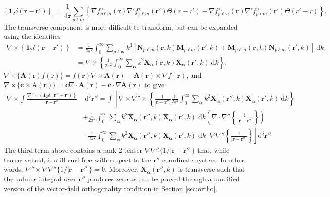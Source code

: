 \documentclass{article}
\numberwithin{equation}{section}
\begin{document}
\begin{equation}
\left[\bm{1}_2\delta(\mathbf{r} - \mathbf{r}')\right]_\parallel = \frac{1}{4\pi}\sum_{p\ell m}\left\{\nabla f_{p\ell m}^>(\mathbf{r}) \nabla'f_{p\ell m}^<(\mathbf{r}')\Theta(r - r') + \nabla f_{p\ell m}^<(\mathbf{r})\nabla'f_{p\ell m}^>(\mathbf{r}')\Theta(r' - r)\right\}.
\end{equation}
The transverse component is more difficult to transform, but can be expanded using the identities
\begin{equation}
\begin{split}
\nabla\times\left\{\bm{1}_2\delta(\mathbf{r} - \mathbf{r}')\right\} &= \frac{1}{2\pi^2}\int_0^\infty\sum_{p\ell m}k^3\left[\mathbf{N}_{p\ell m}(\mathbf{r},k)\mathbf{M}_{p\ell m}(\mathbf{r}',k) + \mathbf{M}_{p\ell m}(\mathbf{r},k)\mathbf{N}_{p\ell m}(\mathbf{r}',k)\right]\;\mathrm{d}k\\
&= \nabla\times\left\{\frac{1}{2\pi^2}\int_0^\infty\sum_{\bm{\alpha}}k^2\mathbf{X}_{\bm{\alpha}}(\mathbf{r},k)\mathbf{X}_{\bm{\alpha}}(\mathbf{r}',k)\;\mathrm{d}k\right\},
\end{split}
\end{equation}
$\nabla\times\{\mathbf{A}(\mathbf{r})f(\mathbf{r})\} = f(\mathbf{r})\nabla\times\mathbf{A}(\mathbf{r}) - \mathbf{A}(\mathbf{r})\times\nabla f(\mathbf{r})$, and $\nabla\times\{\mathbf{c}\times \mathbf{A}(\mathbf{r})\} = \mathbf{c}\nabla\cdot \mathbf{A}(\mathbf{r}) - \mathbf{c}\cdot\nabla \mathbf{A}(\mathbf{r})$ to give
\begin{equation}
\begin{split}
\nabla\times\int\frac{\nabla''\times\left\{\bm{1}_2\delta(\mathbf{r}'' - \mathbf{r}')\right\}}{|\mathbf{r} - \mathbf{r}''|}&\;\mathrm{d}^3\mathbf{r}'' = \int\left[\nabla\times\nabla''\times\left\{\frac{1}{|\mathbf{r} - \mathbf{r}''|}\frac{1}{2\pi^2}\int_0^\infty\sum_{\bm{\alpha}}k^2\mathbf{X}_{\bm{\alpha}}(\mathbf{r}'',k)\mathbf{X}_{\bm{\alpha}}(\mathbf{r}',k)\;\mathrm{d}k\right\}\right.\\
&+\frac{1}{2\pi^2}\int_0^\infty\sum_{\bm{\alpha}}k^2\mathbf{X}_{\bm{\alpha}}(\mathbf{r}'',k)\mathbf{X}_{\bm{\alpha}}(\mathbf{r}',k)\;\mathrm{d}k\left(\nabla\cdot\nabla''\left\{\frac{1}{|\mathbf{r} - \mathbf{r}''|}\right\}\right)\\
&\left.-\frac{1}{2\pi^2}\int_0^\infty\sum_{\bm{\alpha}}k^2\mathbf{X}_{\bm{\alpha}}(\mathbf{r}'',k)\mathbf{X}_{\bm{\alpha}}(\mathbf{r}',k)\;\mathrm{d}k\cdot\nabla\nabla''\left\{\frac{1}{|\mathbf{r} - \mathbf{r}''|}\right\}\right]\mathrm{d}^3\mathbf{r}''
\end{split}
\end{equation}
The third term above contains a rank-2 tensor $\nabla\nabla''\{1/|\mathbf{r} - \mathbf{r}''|\}$ that, while tensor valued, is still curl-free with respect to the $\mathbf{r}''$ coordinate system. In other words, $\nabla''\times\nabla\nabla''\{1/|\mathbf{r} - \mathbf{r}''|\} = 0$. Moreover, $\mathbf{X}_{\bm{\alpha}}(\mathbf{r}'',k)$ is transverse such that the volume integral over $\mathbf{r}''$ produces zero as can be proved through a modified version of the vector-field orthogonality condition in Section \ref{sec:ortho}.
\end{document}
